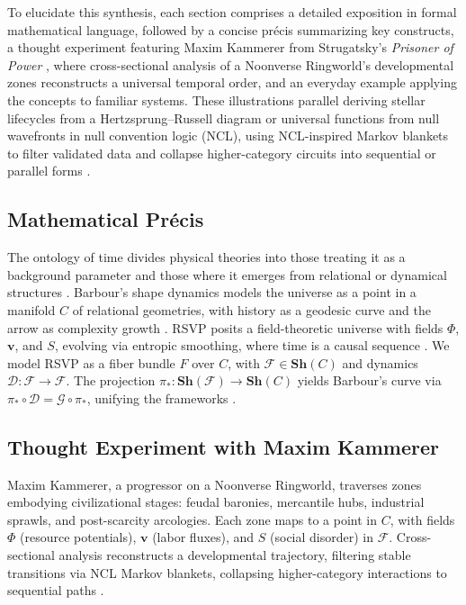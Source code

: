 \documentclass[11pt]{article}
\theoremstyle{plain}
\theoremstyle{definition}
\begin{document}
To elucidate this synthesis, each section comprises a detailed exposition in formal mathematical language, followed by a concise précis summarizing key constructs, a thought experiment featuring Maxim Kammerer from Strugatsky’s \textit{Prisoner of Power} \citep{Strugatsky1971}, where cross-sectional analysis of a Noonverse Ringworld’s developmental zones reconstructs a universal temporal order, and an everyday example applying the concepts to familiar systems. These illustrations parallel deriving stellar lifecycles from a Hertzsprung--Russell diagram or universal functions from null wavefronts in null convention logic (NCL), using NCL-inspired Markov blankets to filter validated data and collapse higher-category circuits into sequential or parallel forms \citep{Baez2010}.

\subsection{Mathematical Précis}
The ontology of time divides physical theories into those treating it as a background parameter and those where it emerges from relational or dynamical structures \citep{Barbour1999}. Barbour’s shape dynamics models the universe as a point in a manifold $C$ of relational geometries, with history as a geodesic curve and the arrow as complexity growth \citep{Barbour2014}. RSVP posits a field-theoretic universe with fields $\Phi$, $\mathbf{v}$, and $S$, evolving via entropic smoothing, where time is a causal sequence \citep{Baas2015}. We model RSVP as a fiber bundle $F$ over $C$, with $\mathscr{F} \in \mathbf{Sh}(C)$ and dynamics $\mathcal{D}: \mathscr{F} \to \mathscr{F}$. The projection $\pi_*: \mathbf{Sh}(\mathscr{F}) \to \mathbf{Sh}(C)$ yields Barbour’s curve via $\pi_* \circ \mathcal{D} = \mathcal{G} \circ \pi_*$, unifying the frameworks \citep{Isham2003}.

\subsection{Thought Experiment with Maxim Kammerer}
Maxim Kammerer, a progressor on a Noonverse Ringworld, traverses zones embodying civilizational stages: feudal baronies, mercantile hubs, industrial sprawls, and post-scarcity arcologies. Each zone maps to a point in $C$, with fields $\Phi$ (resource potentials), $\mathbf{v}$ (labor fluxes), and $S$ (social disorder) in $\mathscr{F}$. Cross-sectional analysis reconstructs a developmental trajectory, filtering stable transitions via NCL Markov blankets, collapsing higher-category interactions to sequential paths \citep{Strugatsky1971}.
\end{document}
